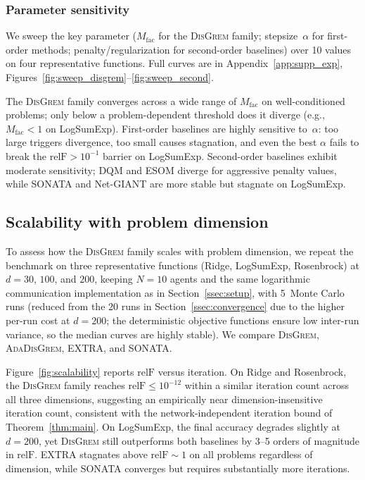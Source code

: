 \documentclass[review,onefignum,onetabnum]{siamart171218}
\begin{document}
	\subsubsection{Parameter sensitivity}
	
	We sweep the key parameter ($M_{\mathrm{fac}}$ for the
	\textsc{DisGrem} family; stepsize~$\alpha$ for first-order methods;
	penalty/regularization for second-order baselines) over 10 values
	on four representative functions.
	Full curves are in Appendix~\ref{app:supp_exp},
	Figures~\ref{fig:sweep_disgrem}--\ref{fig:sweep_second}.
	
	The \textsc{DisGrem} family converges across a wide range of
	$M_{\mathrm{fac}}$ on well-conditioned problems; only below a
	problem-dependent threshold does it diverge (e.g., $M_{\mathrm{fac}}{<}1$
	on LogSumExp).
	First-order baselines are highly sensitive to~$\alpha$: too large
	triggers divergence, too small causes stagnation, and even the
	best $\alpha$ fails to break the $\mathrm{relF}>10^{-1}$ barrier on
	LogSumExp.
	Second-order baselines exhibit moderate sensitivity; DQM and ESOM
	diverge for aggressive penalty values, while SONATA and Net-GIANT are
	more stable but stagnate on LogSumExp.
	
	\FloatBarrier
	
	\subsection{Scalability with problem dimension}\label{ssec:scalability}
	
	To assess how the \textsc{DisGrem} family scales with problem
	dimension, we repeat the benchmark on three representative functions
	(Ridge, LogSumExp, Rosenbrock) at $d=30$, $100$, and $200$, keeping
	$N=10$ agents and the same logarithmic communication
	implementation as in Section~\ref{ssec:setup}, with
	5~Monte Carlo runs
	(reduced from the 20 runs in Section~\ref{ssec:convergence}
	due to the higher per-run cost at $d{=}200$;
	the deterministic objective functions ensure low inter-run variance,
	so the median curves are highly stable).
	We compare \textsc{DisGrem}, \textsc{AdaDisGrem}, EXTRA, and SONATA.
	
	Figure~\ref{fig:scalability} reports $\mathrm{relF}$ versus iteration.
	On Ridge and Rosenbrock, the \textsc{DisGrem} family reaches
	$\mathrm{relF}\le 10^{-12}$ within a similar iteration count across
	all three dimensions, suggesting an empirically near dimension-insensitive
	iteration count, consistent with the network-independent iteration bound
	of Theorem~\ref{thm:main}.
	On LogSumExp, the final accuracy degrades slightly at $d=200$, yet
	\textsc{DisGrem} still outperforms both baselines by 3--5 orders
	of magnitude in $\mathrm{relF}$.
	EXTRA stagnates above $\mathrm{relF}\sim 1$ on all problems
	regardless of dimension, while SONATA converges but requires
	substantially more iterations.
	
\end{document}
